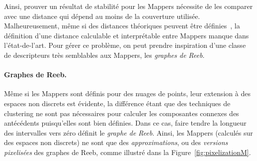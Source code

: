 
Ainsi, prouver un r\'esultat de stabilit\'e pour les Mappers n\'ecessite de les comparer avec une distance qui d\'epend au moins de la couverture utilis\'ee.
Malheureusement, m\^eme si des distances th\'eoriques peuvent \^etre d\'efinies~\cite{Munch16}, 
la d\'efinition d'une distance calculable et interpr\'etable entre Mappers manque dans l'\'etat-de-l'art.
Pour g\'erer ce probl\`eme, on peut prendre inspiration d'une classe de descripteurs tr\`es semblables aux Mappers, les {\em graphes de Reeb}. 



\paragraph*{Graphes de Reeb.} M\^eme si les Mappers sont d\'efinis pour des nuages de points, leur extension \`a des espaces non discrets
est \'evidente, la diff\'erence \'etant que des techniques de clustering ne sont pas n\'ecessaires pour calculer les composantes connexes 
des ant\'ec\'edents puisqu'elles sont bien d\'efinies. Dans ce cas, faire tendre la longueur des intervalles vers z\'ero d\'efinit le {\em graphe de Reeb}.
Ainsi, les Mappers (calcul\'es sur des espaces non discrets) ne sont que des {\em approximations}, ou des {\em versions pixelis\'ees} des
graphes de Reeb, comme illustr\'e dans la Figure~\ref{fig:pixelizationM}.


